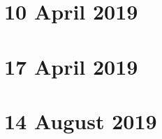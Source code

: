 \documentclass[../main/main.tex]{subfiles}
\begin{document}
\section{10 April 2019}
\section{17 April 2019}
\section{14 August 2019}
\end{document}
